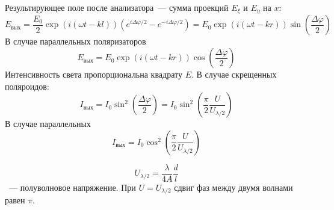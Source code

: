 Результирующее поле после анализатора~--- сумма проекций $E_{\xi}$ и $E_{\eta}$ на $x$:
\[
    E_{\text{вых}} = \frac{E_{0}}{2}\exp{\left(i\left(\omega t - kl\right)\right)}\left(e^{i\Delta \varphi / 2} - e^{-i\Delta\varphi / 2}\right) = E_{0}\exp{\left(i\left(\omega t - kr\right)\right)} \sin \left(\frac{ \Delta \varphi}{2}\right)
\]
В случае параллельных поляризаторов
\[
    E_{\text{вых}} =E_{0}\exp{\left(i\left(\omega t - kr\right)\right)} \cos \left(\frac{ \Delta \varphi}{2}\right) 
\]
Интенсивность света пропорциональна квадрату $E$. В случае скрещенных поляроидов:
\[
    I_{\text{вых}} = I_{0} \sin^{2} \left(\frac{ \Delta \varphi}{2}\right) = I_{0} \sin^{2} \left(\frac{\pi}{2}\frac{U}{U_{\lambda / 2}}\right) 
\]
В случае параллельных
\[
    I_{\text{вых}} = I_{0} \cos^{2} \left(\frac{\pi}{2}\frac{U}{U_{\lambda / 2}}\right)
\]

\[
    U_{\lambda /  2} = \frac{\lambda}{4A}\frac{d}{l}
\]
~--- полуволновое напряжение. При $U=U_{\lambda / 2}$ сдвиг фаз между двумя волнами равен $\pi$. 

